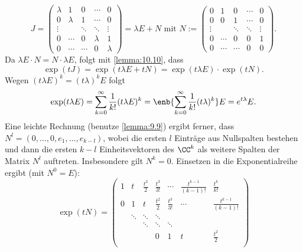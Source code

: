 \begin{anwendung}
	\[
	J = \begin{pmatrix}
	\lambda & 1       & 0      & \cdots  & 0       \\
	0       & \lambda & 1      & \cdots  & 0       \\
	\vdots  &         & \ddots & \ddots  & \vdots  \\
	0       & \cdots  & 0      & \lambda & 1       \\
	0       & \cdots  & \cdots & 0       & \lambda
	\end{pmatrix} = \lambda E + N \text{ mit } N:=
	\begin{pmatrix}
	0      & 1      & 0      & \cdots & 0      \\
	0      & 0      & 1      & \cdots & 0      \\
	\vdots &        & \ddots & \ddots & \vdots \\
	0      & \cdots & 0      & 0      & 1      \\
	0      & \cdots & \cdots & 0      & 0
	\end{pmatrix}.
	\]
	Da $\lambda E \cdot N = N \cdot \lambda E$, folgt mit \autoref{lemma:10.10}, dass
	\[
	\exp(tJ) = \exp(t\lambda E + tN) = \exp(t \lambda E) \cdot \exp(tN).
	\]
	Wegen $(t\lambda E)^{k} = (t\lambda)^{k}E$ folgt
	\[
	\exp(t\lambda E) = \sum_{k=0}^{\infty} \frac{1}{k!} (t \lambda E)^{k} = \enb{\sum_{k=0}^{\infty} \frac{1}{k!} (t\lambda)^{k}} E = e^{t\lambda} E.
	\]
	Eine leichte Rechnung (benutze \autoref{lemma:9.9}) ergibt ferner, dass $N^{l} = (0, \dots, 0,e_1,\dots,e_{k-l})$, wobei die ersten $l$ Einträge aus Nullspalten bestehen und dann die ersten $k-l$ Einheitsvektoren des $\CC^{k}$ als weitere Spalten der Matrix $N^{l}$ auftreten.
	Insbesondere gilt $N^{k} = 0$.
	Einsetzen in die Exponentialreihe ergibt (mit $N^0 = E$):
	\[
	\exp(tN) =
	\begin{pmatrix}
	1 & t      & \frac{t^2}{2} & \frac{t^3}{3!} & \cdots         & \frac{t^{k-1}}{(k-1)!} & \frac{t^{k}}{k!}       \\
	0 & 1      & t             & \frac{t^2}{2}  & \frac{t^3}{3!} & \cdots                 & \frac{t^{k-1}}{(k-1)!} \\
	& \ddots & \ddots        & \ddots         &                &                        &  \\
	&        & \ddots        & \ddots         & \ddots         &                        &  \\
	&        &               & 0              & 1              & t                      & \frac{t^2}{2}          \\

\end{pmatrix}\]
\end{anwendung}
